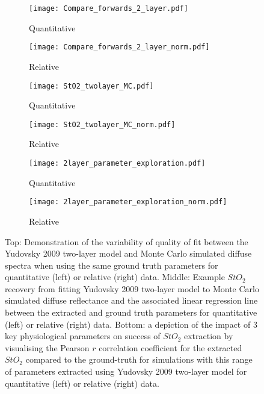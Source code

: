 \begin{figure}[htbp]
    \centering
    \begin{subfigure}{0.49\textwidth}
        \texttt{[image: Compare\_forwards\_2\_layer.pdf]}
        \caption{Quantitative}
        \label{fig:egtwolayerMCforwards}
    \end{subfigure}
    \begin{subfigure}{0.49\textwidth}
        \texttt{[image: Compare\_forwards\_2\_layer\_norm.pdf]}
        \caption{Relative}
        \label{fig:egtwolayerMCforwardsnorm}
    \end{subfigure}
    \begin{subfigure}{0.49\textwidth}
        \texttt{[image: StO2\_twolayer\_MC.pdf]}
        \caption{Quantitative}
        \label{fig:egparamsStO2MC}
    \end{subfigure}
    \begin{subfigure}{0.49\textwidth}
        \texttt{[image: StO2\_twolayer\_MC\_norm.pdf]}
        \caption{Relative}
        \label{fig:egparamsStO2MCnorm}
    \end{subfigure}
    \begin{subfigure}{0.49\textwidth}
        \texttt{[image: 2layer\_parameter\_exploration.pdf]}
        \caption{Quantitative}
        \label{fig:egparamsfailureMC}
    \end{subfigure}
    \begin{subfigure}{0.49\textwidth}
        \texttt{[image: 2layer\_parameter\_exploration\_norm.pdf]}
        \caption{Relative}
        \label{fig:egparamsfailureMCnorm}
    \end{subfigure}
    \caption{Top: Demonstration of the variability of quality of fit between the Yudovsky 2009 two-layer model and Monte Carlo simulated diffuse spectra when using the same ground truth parameters for quantitative (left) or relative (right) data. Middle: Example $StO_2$ recovery from fitting Yudovsky 2009 two-layer model to Monte Carlo simulated diffuse reflectance and the associated linear regression line between the extracted and ground truth parameters for quantitative (left) or relative (right) data. Bottom: a depiction of the impact of 3 key physiological parameters on success of $StO_2$ extraction by visualising the Pearson $r$ correlation coefficient for the extracted $StO_2$ compared to the ground-truth for simulations with this range of parameters extracted using Yudovsky 2009 two-layer model for quantitative (left) or relative (right) data.}
    \label{fig:MC2layer}
\end{figure}

